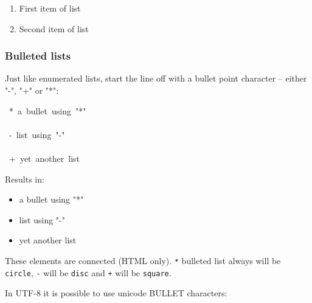 \documentclass[12pt]{article}
\begin{document}
\begin{enumerate}[label=\arabic*.]
\item
First item of list

\item
Second item of list
\end{enumerate}
\hypertarget{lbulleted-lists}{}
\subsubsection{Bulleted lists}

Just like enumerated lists, start the line off with a bullet point
character -- either "-", "+" or "*":

\begin{ttfamily}\begin{flushleft}
\mbox{~*~a~bullet~using~"*"}\\
\mbox{}\\
\mbox{~-~list~using~"-"}\\
\mbox{}\\
\mbox{~+~yet~another~list}\\
\end{flushleft}\end{ttfamily}

Results in:

 \begin{itemize}
\item
a bullet using "*"
 \end{itemize}
 \begin{itemize}
\item
list using "-"
 \end{itemize}
 \begin{itemize}
\item
yet another list
\end{itemize}

These elements are connected (HTML only). \texttt{*} bulleted list always will be
\texttt{circle}, \texttt{-} will be \texttt{disc} and \texttt{+} will be \texttt{square}.

In UTF-8 it is possible to use unicode BULLET characters:
\end{document}
